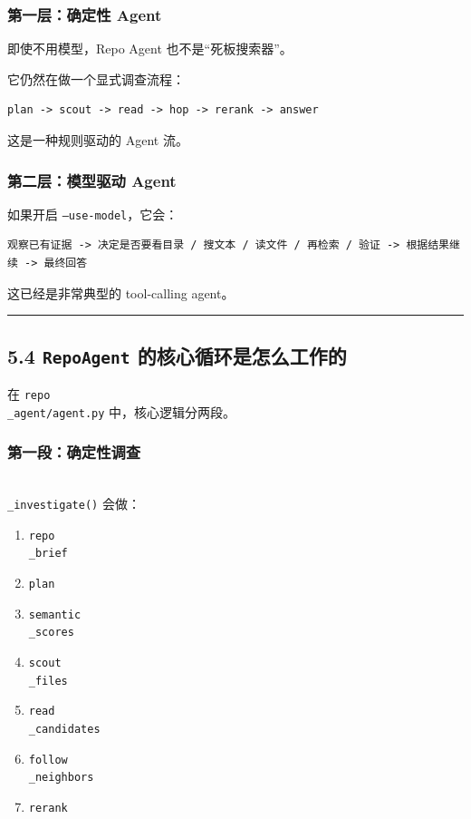 \documentclass[UTF8,12pt,openany]{ctexbook}
\begin{document}
\subsubsection{第一层：确定性 Agent}

即使不用模型，Repo Agent 也不是“死板搜索器”。  \par
它仍然在做一个显式调查流程：\par

\begin{lstlisting}
plan -> scout -> read -> hop -> rerank -> answer
\end{lstlisting}

这是一种规则驱动的 Agent 流。\par

\subsubsection{第二层：模型驱动 Agent}

如果开启 \texttt{--use-model}，它会：\par

\begin{lstlisting}
观察已有证据 -> 决定是否要看目录 / 搜文本 / 读文件 / 再检索 / 验证 -> 根据结果继续 -> 最终回答
\end{lstlisting}

这已经是非常典型的 tool-calling agent。\par

\hrule

\subsection{5.4 \texttt{RepoAgent} 的核心循环是怎么工作的}

在 \texttt{repo\\_agent/agent.py} 中，核心逻辑分两段。\par

\subsubsection{第一段：确定性调查}

\texttt{\\_investigate()} 会做：\par

\begin{enumerate}
\item \texttt{repo\\_brief}
\item \texttt{plan}
\item \texttt{semantic\\_scores}
\item \texttt{scout\\_files}
\item \texttt{read\\_candidates}
\item \texttt{follow\\_neighbors}
\item \texttt{rerank}
\end{enumerate}
\end{document}
